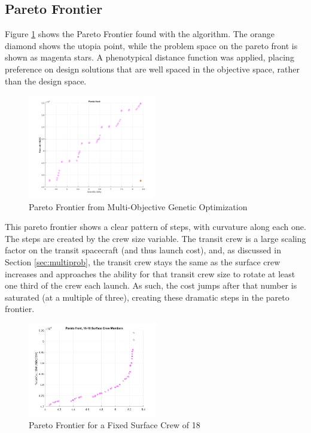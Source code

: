 \documentclass[]{aiaa-pretty}
\begin{document}
\subsection{Pareto Frontier}
Figure \ref{fig:gamultipareto} shows the Pareto Frontier found with the  algorithm.  The orange diamond shows the utopia point, while the problem space on the pareto front is shown as magenta stars. A phenotypical distance function was applied, placing preference on design solutions that are well spaced in the objective space, rather than the design space.
\begin{figure}[h!]
	\centering
	\includegraphics[width=0.5\textwidth]{ga-multi-pareto}
	\caption{Pareto Frontier from Multi-Objective Genetic Optimization}
	\label{fig:gamultipareto}
\end{figure}

This pareto frontier shows a clear pattern of steps, with curvature along each one.  The steps are created by the crew size variable. The transit crew is a large scaling factor on the transit spacecraft (and thus launch cost), and, as discussed in Section \ref{sec:multiprob}, the transit crew stays the same as the surface crew increases and approaches the ability for that transit crew size to rotate at least one third of the crew each launch.  As such, the cost jumps after that number is saturated (at a multiple of three), creating these dramatic steps in the pareto frontier.

\begin{figure}[htb!]
	\centering
	\includegraphics[width=0.5\textwidth]{pareto18}
	\caption{Pareto Frontier for a Fixed Surface Crew of 18}
	\label{fig:pareto18}
\end{figure}
\end{document}
